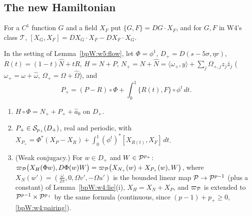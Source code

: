 \subsection{The new Hamiltonian}\label{bpW:w5:newham-sec}

For a $C^1$ function $G$ and a field $X_F$ put $\{G,F\}=DG\cdot X_F$, and for $G,F$ in W4's class $\mathcal T$,
$[X_G,X_F]=DX_G\cdot X_F-DX_F\cdot X_G$.

\begin{lemma}\label{bpW:w5:new-ham}
In the setting of Lemma~\ref{bpW:w5:flow}, let $\Phi=\phi^1$, $D_+=D(s-5\sigma,\eta r)$, $R(t)=(1-t)\hat N+tR$,
$H=N+P$, $N_+=N+\hat N=\langle\omega_+,y\rangle+\sum_j\Omega_{+,j}z_j\bar z_j$ ($\omega_+=\omega+\hat\omega$,
$\Omega_+=\Omega+\hat\Omega$), and
\[P_+=(P-R)\circ\Phi+\int_0^1\{R(t),F\}\circ\phi^t\,dt.\]
\begin{enumerate}[label=(\roman*)]
\item $H\circ\Phi=N_++P_++\hat a_0$ on $D_+$.
\item $P_+\in\mathcal S_{p_+}(D_+)$, real and periodic, with
  $X_{P_+}=\Phi^*(X_P-X_R)+\int_0^1(\phi^t)^*[X_{R(t)},X_F]\,dt$.
\item (Weak conjugacy.) For $w\in D_+$ and $W\in\mathcal P^{p_+}$:
  $\varpi_{\mathcal P}\bigl(X_H(\Phi w),D\Phi(w)W\bigr)=\varpi_{\mathcal P}\bigl(X_{N_+}(w)+X_{P_+}(w),W\bigr)$, where
  $X_N(w')=(\frac{\omega}{2\pi},0,\Omega v',-\Omega u')$ is the bounded linear map $\mathcal P\to\mathcal P^{p-1}$ (plus a constant) of
  Lemma~\ref{bpW:w4:lie}(i), $X_H=X_N+X_P$, and $\varpi_{\mathcal P}$ is extended to $\mathcal P^{p-1}\times\mathcal P^{p_+}$ by the same formula
  (continuous, since $(p-1)+p_+\ge0$, \eqref{bpW:w4:pairing}).
\end{enumerate}
\end{lemma}
